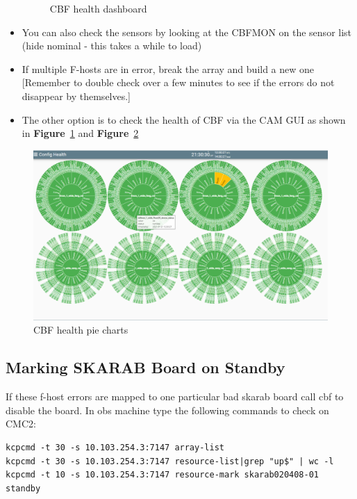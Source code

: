 \begin{itemize}
\begin{figure}[!thb]
	\caption{CBF health dashboard}
	\label{fig:image40}
\end{figure}

\item{} You can also check the sensors by looking at the CBFMON on the sensor list (hide nominal - this takes a while to load)
\item{} If multiple F-hosts are in error, break the array and build a new one [Remember to double check over a few minutes to see if the errors do not disappear by themselves.]
\item{} The other option is to check the health of CBF via the CAM GUI as shown in \textbf{Figure}~\ref{fig:image40} and \textbf{Figure}~\ref{fig:image91}

\end{itemize}


\begin{figure}[!thb]
	\centering
	\includegraphics[scale=0.26]{Chapters/images/image91.png}
	
	\caption{CBF health pie charts}
	\label{fig:image91}
\end{figure}

\subsection{ Marking SKARAB Board on Standby}	
If these f-host errors are mapped to one particular bad skarab board call cbf to disable the board.
In obs machine type the following commands to check on CMC2:
\begin{lstlisting}[style=DOS]
kcpcmd -t 30 -s 10.103.254.3:7147 array-list
kcpcmd -t 30 -s 10.103.254.3:7147 resource-list|grep "up$" | wc -l 
kcpcmd -t 10 -s 10.103.254.3:7147 resource-mark skarab020408-01 standby 
\end{lstlisting}

